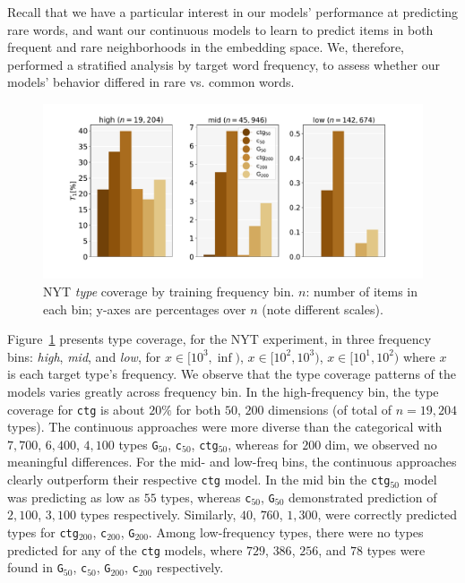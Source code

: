 \documentclass[11pt,a4paper]{article}
\begin{document}
Recall that we have a particular interest in our models' performance at predicting rare words, and want our continuous models to learn to predict items in both frequent and rare neighborhoods in the embedding space. 
We, therefore, performed a stratified analysis by target word frequency, to assess whether our models' behavior differed in rare vs. common words.

\begin{figure}[h]
    \centering
    \includegraphics[width=0.47
    \textwidth]{fig/types_coverage_ny200.pdf}
    \caption{NYT \textit{type} coverage by training frequency bin. $n$: number of items in each bin; y-axes are percentages over $n$ (note different scales).}
    \vspace{-0.15in}
    \label{fig:type_coverage_ny}
\end{figure}


Figure~\ref{fig:type_coverage_ny} presents type coverage, for the NYT experiment, in three frequency bins: \textit{high}, \textit{mid}, and \textit{low}, for $x\in[10^3,\inf)$, $x\in[10^2,10^3)$, $x\in[10^1,10^2)$ where $x$ is each target type's frequency. 
We observe that the type coverage patterns of the models varies greatly across frequency bin.
In the high-frequency bin, the type coverage for {\tt ctg} is about $20\%$ for both $50$, $200$ dimensions (of total of $n=19,204$ types). 
The continuous approaches were more diverse than the categorical with $7,700$, $6,400$, $4,100$ types {\tt G}$_{50}$, {\tt c}$_{50}$, {\tt ctg}$_{50}$, whereas for $200$ dim, we observed no meaningful differences. 
For the mid- and low-freq bins, the continuous approaches clearly outperform their respective {\tt ctg} model. 
In the mid bin the {\tt ctg}$_{50}$ model was predicting as low as $55$ types, whereas {\tt c}$_{50}$, {\tt G}$_{50}$ demonstrated prediction of $2,100$, $3,100$ types respectively. 
Similarly, $40$, $760$, $1,300$, were correctly predicted types for {\tt ctg}$_{200}$, {\tt c}$_{200}$, {\tt G}$_{200}$. 
Among low-frequency types, there were no types predicted for any of the {\tt ctg} models, where $729$, $386$, $256$, and $78$ types were found in {\tt G}$_{50}$, {\tt c}$_{50}$, {\tt G}$_{200}$, {\tt c}$_{200}$ respectively.
\end{document}
